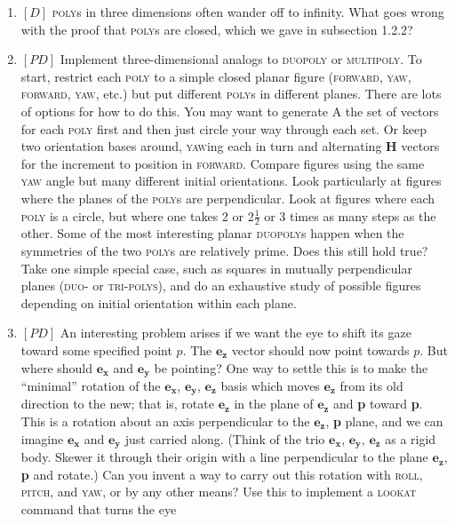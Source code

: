 \documentclass{book}
\begin{document}
\begin{enumerate}
\item $[D]$ \textsc{poly}s in three dimensions often wander off to infinity. What goes
wrong with the proof that \textsc{poly}s are closed, which we gave in subsection
1.2.2?  
\item $[PD]$ Implement three-dimensional analogs to \textsc{duopoly} or \textsc{multipoly}.
To start, restrict each \textsc{poly} to a simple closed planar figure (\textsc{forward},
\textsc{yaw}, \textsc{forward}, \textsc{yaw}, etc.) but put different \textsc{poly}s in different planes.
There are lots of options for how to do this. You may want to generate A
the set of vectors for each \textsc{poly} first and then just circle your way
through each set. Or keep two orientation bases around, \textsc{yaw}ing each in
turn and alternating \textbf{H} vectors for the increment to position in \textsc{forward}.
Compare figures using the same \textsc{yaw} angle but many different initial
orientations. Look particularly at figures where the planes of the \textsc{poly}s
are perpendicular. Look at figures where each \textsc{poly} is a circle, but where
one takes 2 or 2$\frac{1}{2}$ or 3 times as many steps as the other. Some of the
most interesting planar \textsc{duopoly}s happen when the symmetries of the two \textsc{poly}s are relatively prime. Does this still hold true? Take one simple
special case, such as squares in mutually perpendicular planes (\textsc{duo}- or
\textsc{tri}\textsc{-polys}), and do an exhaustive study of possible figures depending on
initial orientation within each plane.
\item $[PD]$ An interesting problem arises if we want the eye to shift its gaze
toward some specified point $p$. The $\mathbf{e_z}$ vector should now point towards
$p$. But where should $\mathbf{e_x}$ and $\mathbf{e_y}$ be pointing? One way to settle this is
to make the ``minimal'' rotation of the $\mathbf{e_x}$, $\mathbf{e_y}$, $\mathbf{e_z}$ basis which moves $\mathbf{e_z}$
from its old direction to the new; that is, rotate $\mathbf{e_z}$ in the plane of $\mathbf{e_z}$
and \textbf{p} toward \textbf{p}. This is a rotation about an axis perpendicular to the
$\mathbf{e_z}$, \textbf{p} plane, and we can imagine $\mathbf{e_x}$ and $\mathbf{e_y}$ just carried along. (Think of
the trio $\mathbf{e_x}$, $\mathbf{e_y}$, $\mathbf{e_z}$ as a rigid body. Skewer it through their origin with a
line perpendicular to the plane $\mathbf{e_z}$, \textbf{p} and rotate.) Can you invent a way
to carry out this rotation with \textsc{roll}, \textsc{pitch}, and \textsc{yaw}, or by any other
means? Use this to implement a \textsc{lookat} command that turns the eye

\end{enumerate}
\end{document}
